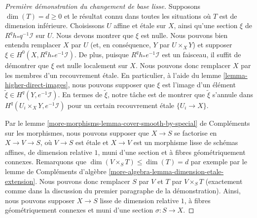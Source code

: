 \begin{proof}[Première démonstration du changement de base lisse]
\medskip\noindent
Supposons $\dim(T) = d \geq 0$ et le résultat connu dans toutes les situations où $T$
est de dimension inférieure. Choisissons $U$ affine et étale sur $X$, ainsi qu'une section $\xi$
de $R^qh_*q^{-1}\mathcal{I}$ sur $U$. Nous devons montrer
que $\xi$ est nulle. Nous pouvons bien entendu remplacer $X$ par $U$
(et, en conséquence, $Y$ par $U \times_X Y$)
et supposer $\xi \in H^0(X, R^qh_*e^{-1}\mathcal{I})$.
De plus, puisque $R^qh_*e^{-1}\mathcal{I}$ est un faisceau,
il suffit de démontrer que $\xi$ est nulle localement sur $X$.
Nous pouvons donc remplacer $X$ par les membres d'un recouvrement étale.
En particulier, à l'aide du lemme \ref{lemma-higher-direct-images},
nous pouvons supposer que $\xi$ est l'image d'un élément
$\tilde \xi \in H^q(Y, e^{-1}\mathcal{I})$.
En termes de $\tilde \xi$, notre tâche est de montrer que
$\tilde \xi$ s'annule dans $H^q(U_i \times_X Y, e^{-1}\mathcal{I})$
pour un certain recouvrement étale $\{U_i \to X\}$.

\medskip\noindent
Par le lemme \ref{more-morphisms-lemma-cover-smooth-by-special} de Compléments sur les morphismes,
nous pouvons supposer que $X \to S$ se factorise en $X \to V \to S$,
où $V \to S$ est étale et $X \to V$ est un morphisme lisse
de schémas affines, de dimension relative $1$, muni d'une section et
à fibres géométriquement connexes. Remarquons que
$\dim(V \times_S T) \leq \dim(T) = d$
par exemple par le lemme de Compléments d'algèbre
\ref{more-algebra-lemma-dimension-etale-extension}.
Nous pouvons donc remplacer $S$ par $V$ et $T$ par $V \times_S T$
(exactement comme dans la discussion du premier paragraphe de la démonstration).
Ainsi, nous pouvons supposer $X \to S$ lisse de dimension relative $1$,
à fibres géométriquement connexes et muni d'une section $\sigma : S \to X$.


\end{proof}
